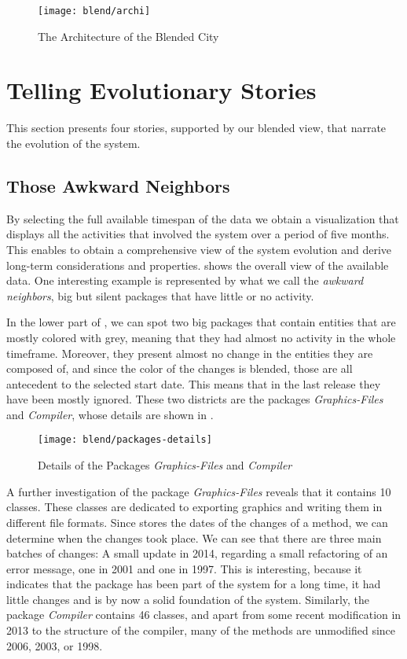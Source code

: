 \begin{figure}[!ht]
\centering
\texttt{[image: blend/archi]}
\caption{The Architecture of the Blended City}
\label{fig:archi}
\end{figure}



\section{Telling Evolutionary Stories}\label{sec:blend-stories}

This section presents four stories, supported by our blended view, that narrate the evolution of the \pha system.


\subsection{Those Awkward Neighbors}

By selecting the full available timespan of the data we obtain a visualization that displays all the activities that involved the \pha system over a period of five months.
This enables to obtain a comprehensive view of the system evolution and derive long-term considerations and properties.
 shows the overall view of the available data.
One interesting example is represented by what we call the \emph{awkward neighbors}, \ie big but silent packages that have little or no activity.

In the lower part of , we can spot two big packages that contain entities that are mostly colored with grey, meaning that they had almost no activity in the whole timeframe.
Moreover, they present almost no change in the entities they are composed of, and since the color of the changes is blended, those are all antecedent to the selected start date.
This means that in the last release they have been mostly ignored.
These two districts are the packages \textit{Graphics-Files} and \textit{Compiler}, whose details are shown in .

\begin{figure}[ht]
\centering
\texttt{[image: blend/packages-details]}
\caption{Details of the Packages \textit{Graphics-Files} and \textit{Compiler}}
\label{fig:packages-details}
\end{figure}

A further investigation of the package \textit{Graphics-Files} reveals that it contains 10 classes.
These classes are dedicated to exporting graphics and writing them in different file formats.
Since \pha stores the dates of the changes of a method, we can determine when the changes took place.
We can see that there are three main batches of changes: A small update in 2014, regarding a small refactoring of an error message, one in 2001 and one in 1997.
This is interesting, because it indicates that the package has been part of the system for a long time, it had little changes and is by now a solid foundation of the system.
Similarly, the package \textit{Compiler} contains 46 classes, and apart from some recent modification in 2013 to the structure of the compiler, many of the methods are unmodified since 2006, 2003, or 1998.

